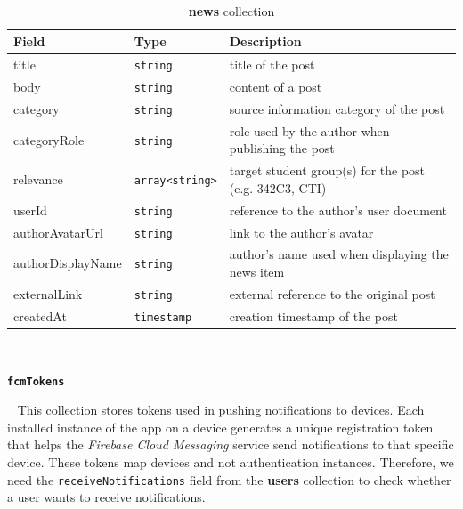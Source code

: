 ~

\begin{table}[th]\small\linespread{1}
    \centering
    \caption{\textbf{news} collection}
    \label{5:tab:users}
    \begin{tabular}{| l | l | p{6.5cm} |}
    \hline
    \textbf{Field} & \textbf{Type} & \textbf{Description} \\
    \hline
    title & \texttt{string} & title of the post
    \\
    \hline
    body & \texttt{string} & content of a post
    \\
    \hline
    category & \texttt{string} & source information category of the post
    \\
    \hline
    categoryRole & \texttt{string} & role used by the author when publishing the post
    \\
    \hline
    relevance & \texttt{array<string>} & target student group(s) for the post (e.g. 342C3, CTI)
    \\
    \hline
    userId & \texttt{string} & reference to the author's user document
    \\
    \hline
    authorAvatarUrl & \texttt{string} & link to the author's avatar
    \\
    \hline
    authorDisplayName & \texttt{string} & author's name used when displaying the news item
    \\
    \hline
    externalLink & \texttt{string} & external reference to the original post
    \\
    \hline
    createdAt & \texttt{timestamp} & creation timestamp of the post
    \\
    \hline
    \end{tabular}
\end{table}

~

\faDatabase \hspace{0.1cm} \textbf{\texttt{fcmTokens}}

~
This collection stores tokens used in pushing notifications to devices. Each installed instance of the app on a device generates a unique registration token that helps the \textit{Firebase Cloud Messaging} service send notifications to that specific device. These tokens map devices and not authentication instances. Therefore, we need the \texttt{receiveNotifications} field from the \textbf{users} collection to check whether a user wants to receive notifications.
~

